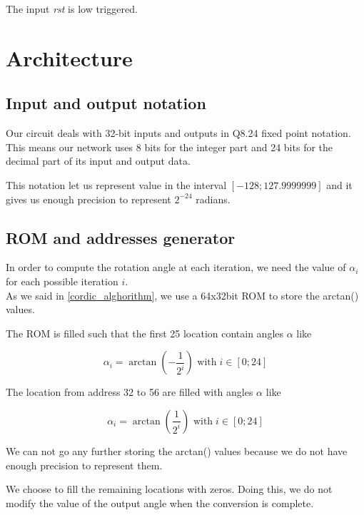 \documentclass[12pt,a4paper]{report}
\begin{document}
The input \emph{rst} is low triggered.


\chapter{Architecture}

\section{Input and output notation}
Our circuit deals with 32-bit inputs and outputs in Q8.24 fixed point notation. This means our network uses 8 bits for the integer part and 24 bits for the decimal part of its input and output data.

This notation let us represent value in the interval $ \left[ -128; 127.9999999 \right]$ and it gives us enough precision to represent $2^{-24}$ radians.

\section{ROM and addresses generator}
In order to compute the rotation angle at each iteration, we need the value of $\alpha_{i}$ for each possible iteration $i$.\\
As we said in \ref{cordic_alghorithm}, we use a 64x32bit ROM to store the arctan() values.

The ROM is filled such that the first 25 location contain angles $\alpha$ like

\begin{equation}
\alpha_{i} = \arctan \left( - \dfrac{1}{2^{i}} \right) \mbox{ with} \; i \in \left[0; 24 \right]
\end{equation}

The location from address 32 to 56 are filled with angles $\alpha$ like

\begin{equation}
\alpha_{i} = \arctan \left(\dfrac{1}{2^{i}} \right) \mbox{ with} \; i \in \left[0; 24 \right]
\end{equation}

We can not go any further storing the arctan() values because we do not have enough precision to represent them.

We choose to fill the remaining locations with zeros. Doing this, we do not modify the value of the output angle when the conversion is complete.
\end{document}

